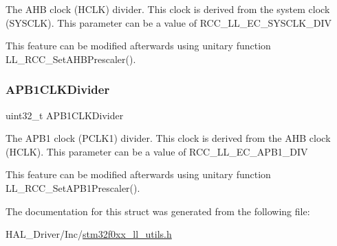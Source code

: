 The A\+HB clock (H\+C\+LK) divider. This clock is derived from the system clock (S\+Y\+S\+C\+LK). This parameter can be a value of R\+C\+C\+\_\+\+L\+L\+\_\+\+E\+C\+\_\+\+S\+Y\+S\+C\+L\+K\+\_\+\+D\+IV

This feature can be modified afterwards using unitary function L\+L\+\_\+\+R\+C\+C\+\_\+\+Set\+A\+H\+B\+Prescaler(). \mbox{\label{struct_l_l___u_t_i_l_s___clk_init_type_def_a994aca51c40decfc340e045da1a6ca19}} 
\subsubsection{\texorpdfstring{A\+P\+B1\+C\+L\+K\+Divider}{APB1CLKDivider}}
{\footnotesize\ttfamily uint32\+\_\+t A\+P\+B1\+C\+L\+K\+Divider}

The A\+P\+B1 clock (P\+C\+L\+K1) divider. This clock is derived from the A\+HB clock (H\+C\+LK). This parameter can be a value of R\+C\+C\+\_\+\+L\+L\+\_\+\+E\+C\+\_\+\+A\+P\+B1\+\_\+\+D\+IV

This feature can be modified afterwards using unitary function L\+L\+\_\+\+R\+C\+C\+\_\+\+Set\+A\+P\+B1\+Prescaler(). 

The documentation for this struct was generated from the following file\+:\begin{DoxyCompactItemize}
\item 
H\+A\+L\+\_\+\+Driver/\+Inc/\hyperlink{stm32f0xx__ll__utils_8h}{stm32f0xx\+\_\+ll\+\_\+utils.\+h}\end{DoxyCompactItemize}
